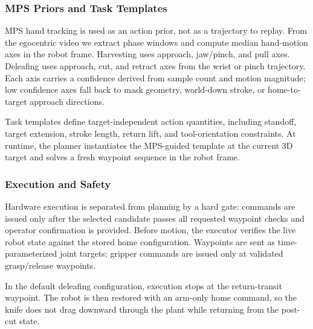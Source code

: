 \subsubsection{MPS Priors and Task Templates}
\label{app:hand_prior}

MPS hand tracking is used as an action prior, not as a trajectory to
replay.  From the egocentric video we extract phase windows and compute
median hand-motion axes in the robot frame.  Harvesting uses
approach, jaw/pinch, and pull axes.  Deleafing uses approach, cut, and
retract axes from the wrist or pinch trajectory.  Each axis carries a
confidence derived from sample count and motion magnitude; low
confidence axes fall back to mask geometry, world-down stroke, or
home-to-target approach directions.

Task templates define target-independent action quantities, including
standoff, target extension, stroke length, return lift, and
tool-orientation constraints.  At runtime, the planner instantiates
the MPS-guided template at the current 3D target and solves a fresh
waypoint sequence in the robot frame.


\subsubsection{Execution and Safety}
\label{app:execution}

Hardware execution is separated from planning by a hard gate: commands
are issued only after the selected candidate passes all requested
waypoint checks and operator confirmation is provided.  Before motion,
the executor verifies the live robot state against the stored home
configuration.  Waypoints are sent as time-parameterized joint targets;
gripper commands are issued only at validated grasp/release waypoints.

In the default deleafing configuration, execution stops at the
return-transit waypoint.  The robot is then restored with an arm-only
home command, so the knife does not drag downward through the plant
while returning from the post-cut state.
